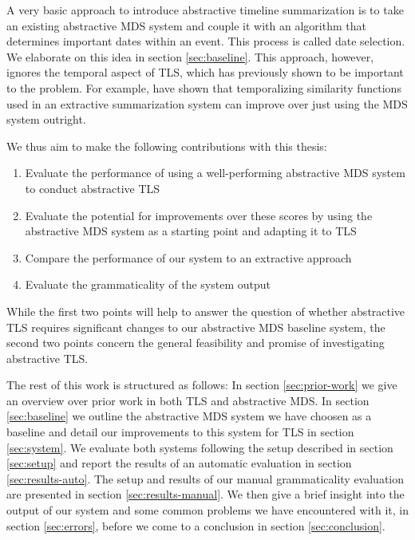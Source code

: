 \documentclass[a4paper,BCOR=10mm]{report}
\numberwithin{lemma}{chapter}
\numberwithin{definition}{chapter}
\begin{document}
A very basic approach to introduce abstractive timeline summarization is to take an existing abstractive MDS system and couple it with an algorithm that determines important dates within an event. This process is called date selection. We elaborate on this idea in section \ref{sec:baseline}. This approach, however, ignores the temporal aspect of TLS, which has previously shown to be important to the problem. For example, \citet{markert} have shown that temporalizing similarity functions used in an extractive summarization system can improve over just using the MDS system outright.

We thus aim to make the following contributions with this thesis:

\begin{enumerate}
\item{Evaluate the performance of using a well-performing abstractive MDS system to conduct abstractive TLS}
\item{Evaluate the potential for improvements over these scores by using the abstractive MDS system as a starting point and adapting it to TLS}
\item{Compare the performance of our system to an extractive approach}
\item{Evaluate the grammaticality of the system output}
\end{enumerate}

While the first two points will help to answer the question of whether abstractive TLS requires significant changes to our abstractive MDS baseline system, the second two points concern the general feasibility and promise of investigating abstractive TLS.

The rest of this work is structured as follows:
In section \ref{sec:prior-work} we give an overview over prior work in both TLS and abstractive MDS.
In section \ref{sec:baseline} we outline the abstractive MDS system we have choosen as a baseline and detail our improvements to this system for TLS in section \ref{sec:system}.
We evaluate both systems following the setup described in 
section \ref{sec:setup} and report the results of an automatic evaluation in section \ref{sec:results-auto}.
The setup and results of our manual grammaticality evaluation are presented in section \ref{sec:results-manual}.
We then give a brief insight into the output of our system and some common problems we have encountered with it, in section \ref{sec:errors}, before we come to a conclusion in section \ref{sec:conclusion}.

\end{document}
